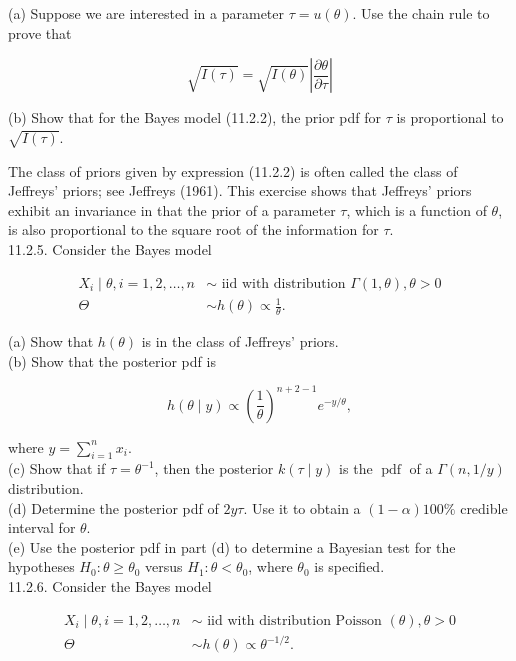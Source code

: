 (a) Suppose we are interested in a parameter $\tau=u(\theta)$. Use the chain rule to prove that


\begin{equation*}
\sqrt{I(\tau)}=\sqrt{I(\theta)}\left|\frac{\partial \theta}{\partial \tau}\right| \tag{11.2.3}
\end{equation*}


(b) Show that for the Bayes model (11.2.2), the prior pdf for $\tau$ is proportional to $\sqrt{I(\tau)}$.

The class of priors given by expression (11.2.2) is often called the class of Jeffreys’ priors; see Jeffreys (1961). This exercise shows that Jeffreys' priors exhibit an invariance in that the prior of a parameter $\tau$, which is a function of $\theta$, is also proportional to the square root of the information for $\tau$.\\
11.2.5. Consider the Bayes model

$$
\begin{aligned}
X_{i} \mid \theta, i=1,2, \ldots, n & \sim \text { iid with distribution } \Gamma(1, \theta), \theta>0 \\
\Theta & \sim h(\theta) \propto \frac{1}{\theta} .
\end{aligned}
$$

(a) Show that $h(\theta)$ is in the class of Jeffreys' priors.\\
(b) Show that the posterior pdf is

$$
h(\theta \mid y) \propto\left(\frac{1}{\theta}\right)^{n+2-1} e^{-y / \theta},
$$

where $y=\sum_{i=1}^{n} x_{i}$.\\
(c) Show that if $\tau=\theta^{-1}$, then the posterior $k(\tau \mid y)$ is the $\operatorname{pdf}$ of a $\Gamma(n, 1 / y)$ distribution.\\
(d) Determine the posterior pdf of $2 y \tau$. Use it to obtain a $(1-\alpha) 100 \%$ credible interval for $\theta$.\\
(e) Use the posterior pdf in part (d) to determine a Bayesian test for the hypotheses $H_{0}: \theta \geq \theta_{0}$ versus $H_{1}: \theta<\theta_{0}$, where $\theta_{0}$ is specified.\\
11.2.6. Consider the Bayes model

$$
\begin{aligned}
X_{i} \mid \theta, i=1,2, \ldots, n & \sim \text { iid with distribution Poisson }(\theta), \theta>0 \\
\Theta & \sim h(\theta) \propto \theta^{-1 / 2} .
\end{aligned}
$$

